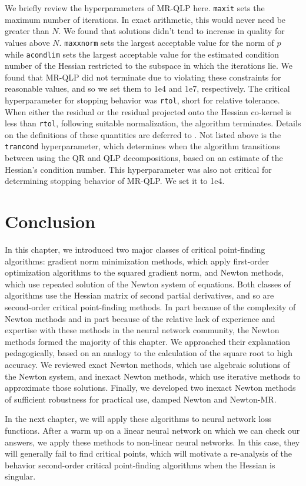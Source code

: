 \documentclass[../../thesis.tex]{subfiles}
\begin{document}
We briefly review the hyperparameters of
MR-QLP here.
\texttt{maxit} sets the maximum number of iterations.
In exact arithmetic, this would never need be greater than $N$.
We found that solutions didn't tend to increase in quality
for values above $N$.
\texttt{maxxnorm} sets the largest acceptable value for the norm of $p$
while \texttt{acondlim} sets the largest acceptable value
for the estimated condition number of the Hessian restricted
to the subspace in which the iterations lie.
We found that MR-QLP did not terminate due to violating these constraints
for reasonable values,
and so we set them to 1e4 and 1e7, respectively.
The critical hyperparameter for stopping behavior was \texttt{rtol},
short for relative tolerance.
When either the
residual or the residual projected onto the Hessian co-kernel
is less than \texttt{rtol},
following suitable normalization,
the algorithm terminates.
Details on the definitions of these quantities
are deferred to .
Not listed above is the \texttt{trancond} hyperparameter,
which determines when the algorithm transitions between
using the QR and QLP decompositions,
based on an estimate of the Hessian's condition number.
This hyperparameter was also not critical
for determining stopping behavior of MR-QLP\@.
We set it to 1e4.

\section{Conclusion}

In this chapter,
we introduced two major classes of critical point-finding algorithms:
gradient norm minimization methods,
which apply first-order optimization algorithms
to the squared gradient norm,
and
Newton methods,
which use repeated solution of the Newton system of equations.
Both classes of algorithms
use the Hessian matrix of second partial derivatives,
and so are second-order critical point-finding methods.
In part because of the complexity of Newton methods
and in part because of the relative lack of experience and expertise
with these methods in the neural network community,
the Newton methods formed the majority of this chapter.
We approached their explanation pedagogically,
based on an analogy to the calculation of the square root
to high accuracy.
We reviewed exact Newton methods,
which use algebraic solutions of the Newton system,
and inexact Newton methods,
which use iterative methods to approximate those solutions.
Finally,
we developed two inexact Newton methods
of sufficient robustness for practical use,
damped Newton and Newton-MR.\@

In the next chapter,
we will apply these algorithms to neural network loss functions.
After a warm up on a linear neural network
on which we can check our answers,
we apply these methods to non-linear neural networks.
In this case, they will generally fail
to find critical points,
which will motivate a re-analysis
of the behavior second-order critical point-finding algorithms
when the Hessian is singular.

\onlyinsubfile{\printbibliography}
\end{document}
